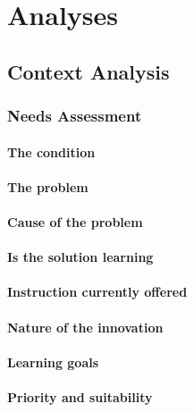 \documentclass[12pt]{report} %
\begin{document}

\part{Analyses}




\chapter{Context Analysis}


\section{Needs Assessment}

\subsection{The condition}

\subsection{The problem}

\subsection{Cause of the problem}

\subsection{Is the solution learning}

\subsection{Instruction currently offered}

\subsection{Nature of the innovation}

\subsection{Learning goals}

\subsection{Priority and suitability}
\end{document}
